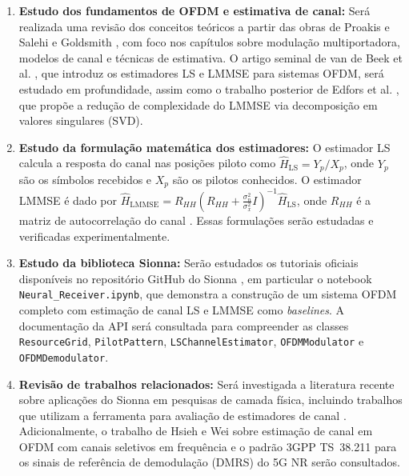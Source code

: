 \documentclass[conference]{IEEEtran}
\begin{document}
\begin{enumerate}
    \item \textbf{Estudo dos fundamentos de OFDM e estimativa de canal:} Será realizada uma revisão dos conceitos teóricos a partir das obras de Proakis e Salehi \cite{proakis2008} e Goldsmith \cite{goldsmith2005}, com foco nos capítulos sobre modulação multiportadora, modelos de canal e técnicas de estimativa. O artigo seminal de van de Beek et al. \cite{vanDeBeek1995}, que introduz os estimadores LS e LMMSE para sistemas OFDM, será estudado em profundidade, assim como o trabalho posterior de Edfors et al. \cite{edfors1998}, que propõe a redução de complexidade do LMMSE via decomposição em valores singulares (SVD).

    \item \textbf{Estudo da formulação matemática dos estimadores:} O estimador LS calcula a resposta do canal nas posições piloto como $\hat{H}_{\text{LS}} = Y_p / X_p$, onde $Y_p$ são os símbolos recebidos e $X_p$ são os pilotos conhecidos. O estimador LMMSE é dado por $\hat{H}_{\text{LMMSE}} = R_{HH}(R_{HH} + \frac{\sigma_n^2}{\sigma_x^2}I)^{-1}\hat{H}_{\text{LS}}$, onde $R_{HH}$ é a matriz de autocorrelação do canal \cite{vanDeBeek1995, edfors1998}. Essas formulações serão estudadas e verificadas experimentalmente.

    \item \textbf{Estudo da biblioteca Sionna:} Serão estudados os tutoriais oficiais disponíveis no repositório GitHub do Sionna \cite{sionna_doc, sionna_github}, em particular o notebook \texttt{Neural\_Receiver.ipynb}, que demonstra a construção de um sistema OFDM completo com estimação de canal LS e LMMSE como \textit{baselines}. A documentação da API será consultada para compreender as classes \texttt{ResourceGrid}, \texttt{PilotPattern}, \texttt{LSChannelEstimator}, \texttt{OFDMModulator} e \texttt{OFDMDemodulator}.

    \item \textbf{Revisão de trabalhos relacionados:} Será investigada a literatura recente sobre aplicações do Sionna em pesquisas de camada física, incluindo trabalhos que utilizam a ferramenta para avaliação de estimadores de canal \cite{cammerer2023, aoudia2024}. Adicionalmente, o trabalho de Hsieh e Wei \cite{hsieh1998} sobre estimação de canal em OFDM com canais seletivos em frequência e o padrão 3GPP TS~38.211 \cite{3gpp38211} para os sinais de referência de demodulação (DMRS) do 5G NR serão consultados.
\end{enumerate}
\end{document}
